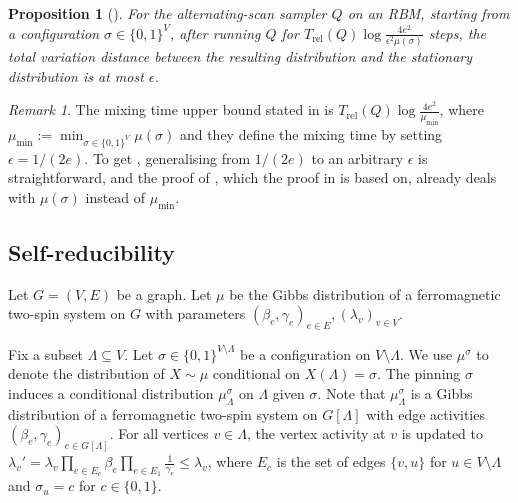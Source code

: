 \documentclass[11pt]{amsart}
\newcommand{\defeq}{:=}
\newtheorem{proposition}[theorem]{Proposition}
\theoremstyle{definition}
\newtheorem{definition}[theorem]{Definition}
\theoremstyle{remark}
\newtheorem*{remark}{Remark}
\begin{document}
\begin{proposition}[]\label{prop:mixing-time-alternating-scan}
For the alternating-scan sampler $Q$ on an RBM, starting from a configuration $\sigma \in \{0,1\}^V$, after running $Q$ for $T_{\text{rel}}(Q) \log \frac{4e^2}{\epsilon^2 \mu(\sigma)}$ steps, the total variation distance between the resulting distribution and the stationary distribution is at most $\epsilon$.
\end{proposition}
\begin{remark}
The mixing time upper bound stated in \cite[Theorem 3]{GuoKZ18} is $T_{\text{rel}}(Q) \log \frac{4e^2}{\mu_{\min}}$, 
where $\mu_{\min} \defeq \min_{\sigma \in \{0,1\}^V} \mu(\sigma)$ and they define the mixing time by setting $\epsilon=1/(2e)$. 
To get , generalising from $1/(2e)$ to an arbitrary $\epsilon$ is straightforward,
and the proof of \cite[Theorem 2.1]{fill1991eigenvalue}, which the proof in \cite{GuoKZ18} is based on, already deals with $\mu(\sigma)$ instead of $\mu_{\min}$.
\end{remark}

\subsection{Self-reducibility}
Let $G = (V,E)$ be a graph. Let $\mu$ be the Gibbs distribution of a ferromagnetic two-spin system on $G$ with parameters $(\beta_e,\gamma_e)_{e \in E},(\lambda_v)_{v \in V}$.

Fix a subset $\Lambda \subseteq V$. Let $\sigma \in \{0,1\}^{V \setminus \Lambda}$ be a configuration on $V \setminus \Lambda$. We use $\mu^\sigma$ to denote the distribution of $X \sim \mu$ conditional on $X(\Lambda) = \sigma$. The pinning $\sigma$ induces a conditional distribution $\mu^\sigma_{\Lambda}$ on $\Lambda$ given $\sigma$. Note that $\mu^\sigma_{\Lambda}$ is a Gibbs distribution of a ferromagnetic two-spin system on $G[\Lambda]$ with edge activities $(\beta_e,\gamma_e)_{e \in G[\Lambda]}$. For all vertices $v \in \Lambda$, the vertex activity at $v$ is updated to $\lambda_v'=\lambda_v \prod_{e \in E_c} \beta_e \prod_{e \in E_1} \frac{1}{\gamma_e} \leq \lambda_v$, where $E_c$ is the set of edges $\{v,u\}$ for $u \in V \setminus \Lambda$ and $\sigma_u = c$ for $c \in \{0,1\}$.
\end{document}
